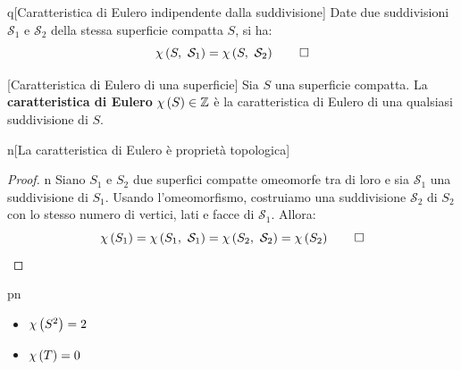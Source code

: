 \begin{theorem}{q}[Caratteristica di Eulero indipendente dalla suddivisione]
Date due suddivisioni $\mathcal{S}_1$ e $\mathcal{S}_2$ della stessa superficie compatta $S$, si ha:
	\begin{equation*}
		\euler{S}{\mathcal{S}_1}=\euler{S}{\mathcal{S}_2}\qedhere
	\end{equation*}
\end{theorem}
\begin{definition}{}[Caratteristica di Eulero di una superficie]
	Sia $S$ una superficie compatta. La \textbf{caratteristica di Eulero} $\euler{S}{\ }\in \Z$ è la caratteristica di Eulero di una qualsiasi suddivisione di $S$.
\end{definition}
\begin{corollary}{n}[La caratteristica di Eulero è proprietà topologica]
\end{corollary}
\begin{proof}{n}
	Siano $S_1$ e $S_2$ due superfici compatte omeomorfe tra di loro e sia $\mathcal{S}_1$ una suddivisione di $S_1$. Usando l'omeomorfismo, costruiamo una suddivisione $\mathcal{S}_2$ di $S_2$ con lo stesso numero di vertici, lati e facce di $\mathcal{S}_1$. Allora:
	\begin{equation*}
		\euler{S_1}{\ }=\euler{S_1}{\mathcal{S}_1}=\euler{S_2}{\mathcal{S}_2}=\euler{S_2}{\ }\qedhere
	\end{equation*}
\end{proof}
\begin{example}{pn}~{}
	\begin{itemize}
		\item $\euler{S^2}{\ }=2$
		\item $\euler{T}{\ }=0$
	\end{itemize}
\end{example}
